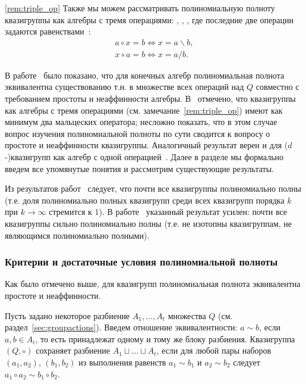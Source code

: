     \begin{remark}
        \ref{rem:triple_op}
        Также мы можем рассматривать полиномиальную полноту квазигруппы как алгебры с тремя операциями: \textquote{$\circ$}, \textquote{$\backslash$}, \textquote{$/$}, где последние две операции задаются равенствами~\cite{belousov}:
        \begin{gather*}
            a \circ x = b \Leftrightarrow x = a \backslash b, \\
            x \circ a = b \Leftrightarrow x = a / b.
        \end{gather*}
    \end{remark}

    В работе~\cite{hagemann} было показано, что для конечных алгебр полиномиальная полнота эквивалентна существованию т.н.  в множестве всех операций над $Q$ совместно с требованием простоты и неаффинности алгебры.
    В~\cite{artamonov2013latin} отмечено, что квазигруппы как алгебры с тремя операциями (см. замечание~\ref{rem:triple_op}) имеют как минимум два мальцеских оператора; несложно показать, что в этом случае вопрос изучения полиномиальной полноты по сути сводится к вопросу о простоте и неаффинности квазигруппы.
    Аналогичный результат верен и для ($d$-)квазигрупп как алгебр с одной операцией~\cite{chap24}.
    Далее в разделе мы формально введем все упомянутые понятия и рассмотрим существующие результаты.

    Из результатов работ~\cite{salomaa63, cameron92} следует, что почти все квазигруппы полиномиально полны (т.е. доля полиномиально полных квазигрупп среди всех квазигрупп порядка $k$ при $k \to \infty$ стремится к 1).
    В работе~\cite{galatenko22} указанный результат усилен: почти все квазигруппы сильно полиномиально полны (т.е. не изотопны квазигруппам, не являющимся полиномиально полными).


\subsubsection{Критерии и достаточные условия полиномиальной полноты}

    Как было отмечено выше, для квазигрупп полиномиальная полнота эквивалентна простоте и неаффинности.

    \begin{definition}
        Пусть задано некоторое разбиение $A_1, \ldots, A_t$ множества $Q$ (см. раздел~\ref{sec:groupactions}).
        Введем отношение эквивалентности: $a \sim b$, если $a, b \in A_i$, то есть принадлежат одному и тому же блоку разбиения.
        Квазигруппа $(Q, \circ)$ сохраняет разбиение $A_1 \sqcup \ldots \sqcup A_t$, если для любой пары наборов $(a_1, a_2)$, $(b_1, b_2)$ из выполнения равенств $a_1 \sim b_1$ и $a_2 \sim b_2$ следует $a_1 \circ a_2 \sim b_1 \circ b_2$. 
    \end{definition}

